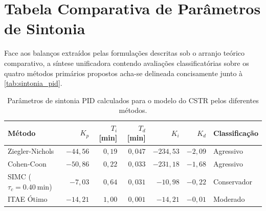 \section{Tabela Comparativa de Parâmetros de Sintonia}
\label{sec:tabela_comparativa}

Face aos balanços extraídos pelas formulações descritas sob o arranjo teórico comparativo, a síntese unificadora contendo avaliações classificatórias sobre os quatro métodos primários propostos acha-se delineada concisamente junto à \autoref{tab:sintonia_pid}.

\begin{table}[htpb]
\centering
\caption{Parâmetros de sintonia PID calculados para o modelo do CSTR pelos diferentes métodos.}
\label{tab:sintonia_pid}
\begin{tabular}{@{}lrrrrrl@{}}
\toprule
\textbf{Método} & \textbf{$K_p$} & \textbf{$T_i$ [\si{\minute}]} & \textbf{$T_d$ [\si{\minute}]} & \textbf{$K_i$} & \textbf{$K_d$} & \textbf{Classificação} \\ 
\midrule
Ziegler-Nichols           & $-44{,}56$ & $0{,}19$ & $0{,}047$ & $-234{,}53$ & $-2{,}09$ & Agressivo \\
Cohen-Coon                & $-50{,}86$ & $0{,}22$ & $0{,}033$ & $-231{,}18$ & $-1{,}68$ & Agressivo \\
SIMC ($\tau_c = \SI{0.40}{\minute}$) & $-7{,}03$  & $0{,}64$ & $0{,}031$ & $-10{,}98$  & $-0{,}22$ & Conservador \\
ITAE Ótimo                & $-14{,}21$ & $1{,}00$ & $0{,}001$ & $-14{,}21$  & $-0{,}01$ & Moderado \\ 
\bottomrule
\end{tabular}
\end{table}
